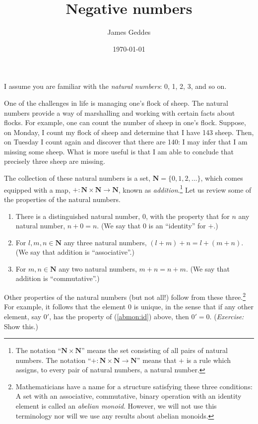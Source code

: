 \documentclass[10pt, a4paper, twocolumn]{article}
\author{James Geddes}
\date{\today}
\title{Negative numbers}
\newcommand{\set}[1]{\mathbold{#1}}
\newcommand{\N}{\set{N}}
\begin{document}
\maketitle

I assume you are familiar with the \emph{natural numbers}: 0, 1, 2, 3,
and so on.

One of the challenges in life is managing one's flock of sheep. The
natural numbers provide a way of marshalling and working with certain
facts about flocks. For example, one can count the number of sheep in
one's flock. Suppose, on Monday, I count my flock of sheep and
determine that I have 143 sheep. Then, on Tuesday I count again and
discover that there are 140: I may infer that I am missing some
sheep. What is more useful is that I am able to conclude that
precisely three sheep are missing.

The collection of these natural numbers is a set,
$\N=\{0,1,2,\dotsc\}$, which comes equipped with a map,
$+:\N\times\N\to\N$, known as \emph{addition}.\footnote{The notation
``$\N\times\N$'' means the set consisting of all pairs of natural
numbers. The notation ``$+:\N\times\N\to\N$'' means that $+$ is a rule
which assigns, to every pair of natural numbers, a natural number.}
Let us review some of the properties of the natural numbers.
\begin{enumerate}
\item There is a distinguished natural number, $0$, with the
  property that for $n$ any natural number, $n+0=n$. (We say that $0$
  is an ``identity'' for $+$.)\label{abmon:id}
\item For $l,m,n\in\N$ any three natural numbers, $(l+m)+n=l+(m+n)$. (We say
  that addition is ``associative''.)
\item For $m,n\in\N$ any two natural numbers, $m+n=n+m$. (We say that
  addition is ``commutative''.)
\end{enumerate}
Other properties of the natural numbers (but not all!) follow from
these three.\footnote{Mathematicians have a name for a structure
satisfying these three conditions: A set with an associative,
commutative, binary operation with an identity element is called an
\emph{abelian monoid}. However, we will not use this terminology nor
will we use any results about abelian monoids.} For example, it
follows that the element $0$ is unique, in the sense that if any other
element, say $0'$, has the property of (\ref{abmon:id}) above, then
$0'=0$. (\emph{Exercise:} Show this.)
\end{document}
